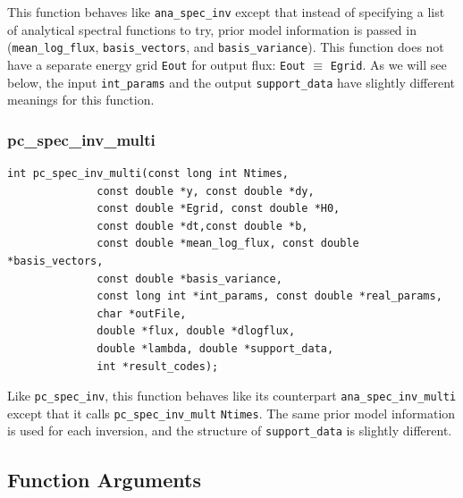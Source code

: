 \documentclass{article}    %
\begin{document}
This function behaves like \verb|ana_spec_inv| except that instead of
specifying a list of analytical spectral functions to try, prior model
information is passed in (\verb|mean_log_flux|, \verb|basis_vectors|,
and \verb|basis_variance|). This function does not have a separate
energy grid \verb|Eout| for output flux: \verb|Eout| $\equiv$
\verb|Egrid|.  As we will see below, the input
\verb|int_params| and the output \verb|support_data| have slightly different
meanings for this function.

\subsubsection{pc\_spec\_inv\_multi}

\begin{verbatim}
int pc_spec_inv_multi(const long int Ntimes,
		      const double *y, const double *dy, 
		      const double *Egrid, const double *H0, 
		      const double *dt,const double *b,
		      const double *mean_log_flux, const double *basis_vectors, 
		      const double *basis_variance,
		      const long int *int_params, const double *real_params,
		      char *outFile, 
		      double *flux, double *dlogflux, 
		      double *lambda, double *support_data, 
		      int *result_codes);
\end{verbatim}

Like \verb|pc_spec_inv|, this function behaves like its counterpart
\verb|ana_spec_inv_multi| except that it calls \verb|pc_spec_inv_mult| \verb|Ntimes|. 
The same prior model information is used for each inversion, and the structure
of \verb|support_data| is slightly different.

\subsection{Function Arguments}
\label{secSpecInvArgs}
\end{document}
